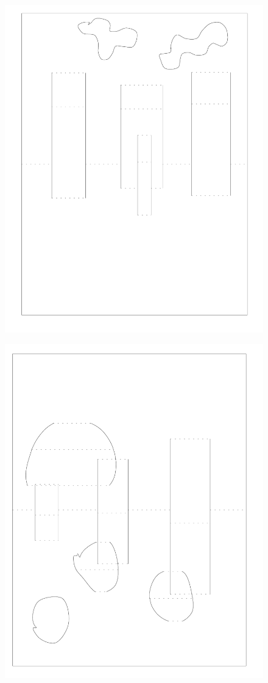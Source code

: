 \begin{figure}[htbp]
\centering
\includegraphics{figures/91_Appendix_DAX_Creations/buildings_clouds.png}
\caption{}
\end{figure}

\begin{figure}[htbp]
\centering
\includegraphics{figures/91_Appendix_DAX_Creations/overlapping_features.png}
\caption{}
\end{figure}
